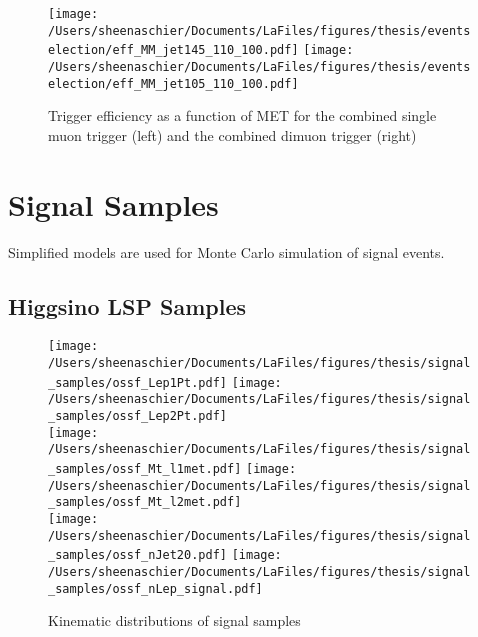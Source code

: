   \begin{figure}[tbp]
     \texttt{[image: /Users/sheenaschier/Documents/LaFiles/figures/thesis/eventselection/eff\_MM\_jet145\_110\_100.pdf]}
       \texttt{[image: /Users/sheenaschier/Documents/LaFiles/figures/thesis/eventselection/eff\_MM\_jet105\_110\_100.pdf]}\\
   \caption{Trigger efficiency as a function of MET for the combined single muon trigger (left) and the combined dimuon trigger (right)}
   \label{fig:TrigEff2}
 \end{figure}
 


\section{Signal Samples}
Simplified models are used for Monte Carlo simulation of signal events.


\subsection{Higgsino LSP Samples}
  \begin{figure}[tbp]

 \texttt{[image: /Users/sheenaschier/Documents/LaFiles/figures/thesis/signal\_samples/ossf\_Lep1Pt.pdf]}
 \texttt{[image: /Users/sheenaschier/Documents/LaFiles/figures/thesis/signal\_samples/ossf\_Lep2Pt.pdf]}\\
 \texttt{[image: /Users/sheenaschier/Documents/LaFiles/figures/thesis/signal\_samples/ossf\_Mt\_l1met.pdf]}
 \texttt{[image: /Users/sheenaschier/Documents/LaFiles/figures/thesis/signal\_samples/ossf\_Mt\_l2met.pdf]}\\
  \texttt{[image: /Users/sheenaschier/Documents/LaFiles/figures/thesis/signal\_samples/ossf\_nJet20.pdf]}
 \texttt{[image: /Users/sheenaschier/Documents/LaFiles/figures/thesis/signal\_samples/ossf\_nLep\_signal.pdf]}\\
   \caption{Kinematic distributions of signal samples}
   \label{fig:SigSample1}
 \end{figure}
 
